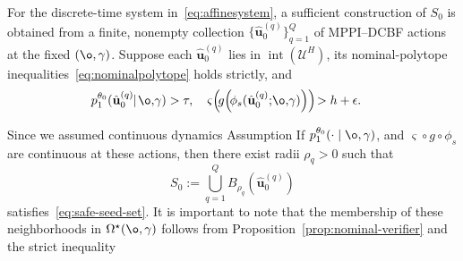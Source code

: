 \begin{assumption} 
\label{ass:mppi-dcbf-seed}
For the discrete-time system in~\eqref{eq:affinesystem}, a sufficient construction of $S_0$ is obtained from a finite, nonempty collection
$\{\hat{\mathbf u}_0^{(q)}\}_{q=1}^{Q}$ of MPPI--DCBF actions at the fixed $(\o,\gamma)$. Suppose each
$\hat{\mathbf u}_0^{(q)}$ lies in
$\operatorname{int}(\mathcal U^H)$, its nominal-polytope
inequalities~\eqref{eq:nominalpolytope} holds strictly, and
\begin{equation}
\begin{aligned}
p_1^{\theta_0}
(\hat{\mathbf u}_0^{(q)}\!\!\mid\!\o,\!\gamma)&>\tau,\quad
\varsigma\!\left(\!g\!\left(\!
\phi_s(\hat{\mathbf u}_0^{(q)};\!\o,\!\gamma)
\right)\right)\!>h+\epsilon.
\end{aligned}
\end{equation}
\end{assumption}
Since we assumed continuous dynamics Assumption
If $p_1^{\theta_0}(\cdot\mid\o,\gamma)$, and
$\varsigma\circ g\circ\phi_s$ are continuous at these actions, then
there exist radii $\rho_q>0$ such that
\begin{equation}
S_0
:=
\bigcup_{q=1}^{Q}
B_{\rho_q}\!\left(\hat{\mathbf u}_0^{(q)}\right)
\label{eq:mppidcbf-seed-set}
\end{equation}
satisfies~\eqref{eq:safe-seed-set}. It is important to note that the membership of these neighborhoods in $\Omega^\star(\o,\gamma)$ follows from Proposition~\ref{prop:nominal-verifier} and the strict inequality

